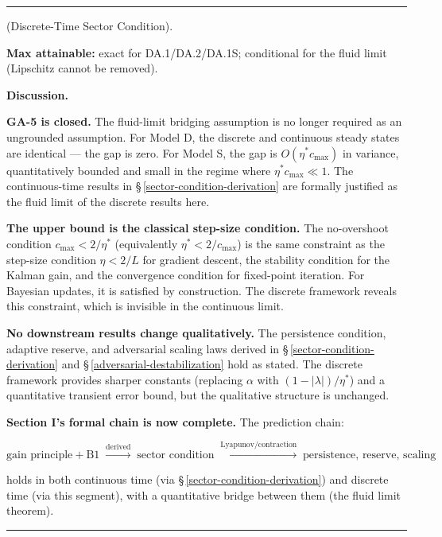 \documentclass[11pt,oneside]{article}
\newcounter{claim}[section]
\renewcommand{\theclaim}{\thesection.\arabic{claim}}
\newenvironment{segment}[2]{%
  \refstepcounter{claim}%
  \bigskip\noindent\hrule\smallskip
  \noindent{\bfseries #1~\theclaim}\enskip(#2).\par\smallskip
  \noindent\ignorespaces
}{%
  \par\smallskip\noindent\hrule\bigskip
}
\newenvironment{derivation}[1][]{\begin{segment}{Derivation}{#1}}{\end{segment}}
\begin{document}
\begin{derivation}[Discrete-Time Sector Condition]
\textbf{Max attainable:} exact for DA.1/DA.2/DA.1S; conditional for the fluid limit (Lipschitz cannot be removed).


\medskip\noindent\textbf{Discussion.}


\textbf{GA-5 is closed.} The fluid-limit bridging assumption is no longer required as an ungrounded assumption. For Model D, the discrete and continuous steady states are identical — the gap is zero. For Model S, the gap is $O(\eta^* c_{\max})$ in variance, quantitatively bounded and small in the regime where $\eta^* c_{\max} \ll 1$. The continuous-time results in \S\,\ref{sector-condition-derivation} are formally justified as the fluid limit of the discrete results here.

\textbf{The upper bound is the classical step-size condition.} The no-overshoot condition $c_{\max} < 2/\eta^*$ (equivalently $\eta^* < 2/c_{\max}$) is the same constraint as the step-size condition $\eta < 2/L$ for gradient descent, the stability condition for the Kalman gain, and the convergence condition for fixed-point iteration. For Bayesian updates, it is satisfied by construction. The discrete framework reveals this constraint, which is invisible in the continuous limit.

\textbf{No downstream results change qualitatively.} The persistence condition, adaptive reserve, and adversarial scaling laws derived in \S\,\ref{sector-condition-derivation} and \S\,\ref{adversarial-destabilization} hold as stated. The discrete framework provides sharper constants (replacing $\alpha$ with $(1 - \lvert\lambda\rvert)/\eta^*$) and a quantitative transient error bound, but the qualitative structure is unchanged.

\textbf{Section I's formal chain is now complete.} The prediction chain:

$$\text{gain principle} + \text{B1} \;\xrightarrow{\text{derived}}\; \text{sector condition} \;\xrightarrow{\text{Lyapunov/contraction}}\; \text{persistence, reserve, scaling}$$

holds in both continuous time (via \S\,\ref{sector-condition-derivation}) and discrete time (via this segment), with a quantitative bridge between them (the fluid limit theorem).

\end{derivation}
\end{document}
